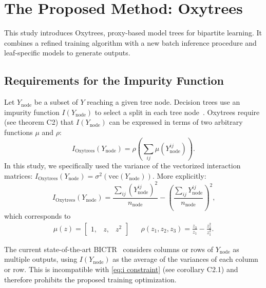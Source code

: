 \documentclass[letterpaper]{article}
\begin{document}
\section{The Proposed Method: Oxytrees}
\label{sec:oxytrees}

This study introduces Oxytrees, proxy-based model trees for bipartite learning. It combines a refined training algorithm with a new batch inference procedure and leaf-specific models to generate outputs.


\subsection{Requirements for the Impurity Function}
\label{sec:oxytrees impurity}

Let $Y_\text{node}$ be a subset of
$Y$ reaching a given tree node.
Decision trees use an impurity function $I(Y_\text{node})$ to select a split in each tree node~\cite{breiman_classification_1984,blockeel1998top}.
Oxytrees require (see theorem C2) that $I(Y_\text{node})$ can be expressed in terms of two arbitrary functions $\mu$ and $\rho$:
\begin{equation}
    \label{eq:i constraint}
    \textstyle
    I_\text{Oxytrees} (Y_\text{node}) = \rho(\sum_{ij}\mu(Y_\text{node}^{ij}))
    \text{.}
\end{equation}
In this study, we specifically used the variance of the vectorized interaction matrices: $I_\text{Oxytrees} (Y_\text{node}) = \sigma^2(\text{vec}(Y_\text{node}))$. More explicitly:
\begin{equation}
    \label{eq:i bgso}
    I_\text{Oxytrees} (Y_\text{node})
    = \frac{\sum_{ij}(Y^{ij}_\text{node})^2}{n_\text{node}} - \left(\frac{\sum_{ij}Y^{ij}_\text{node}}{n_\text{node}}\right)^2
    \text{,}
\end{equation}
which corresponds to
\begin{align}
    \mu(z) = \begin{bmatrix} 1, & z, & z^2 \end{bmatrix}
    &&
    \rho(z_1, z_2, z_3) = \frac{z_3}{z_1} - \frac{z_2^2}{z_1^2}
    \text{.}
\end{align}

The current state-of-the-art BICTR~\cite{pliakos_drug-target_2020} considers columns or rows of $Y_\text{node}$ as multiple outputs, using $I(Y_\text{node})$ as the average of the variances of each column or row. This is incompatible with \cref{eq:i constraint} (see corollary C2.1) and therefore prohibits the proposed training optimization.
\end{document}
